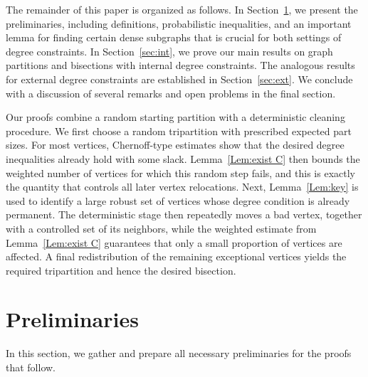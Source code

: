 \documentclass{aic}
\begin{document}
	\bigskip
	
	The remainder of this paper is organized as follows.
	In Section~\ref{sec:pre}, we present the preliminaries, including definitions, probabilistic inequalities,
	and an important lemma for finding certain dense subgraphs that is crucial for both settings of degree constraints.
	In Section~\ref{sec:int}, we prove our main results on graph partitions and bisections with internal degree constraints.
	The analogous results for external degree constraints are established in Section~\ref{sec:ext}.
	We conclude with a discussion of several remarks and open problems in the final section.
	
	\medskip
	
	Our proofs combine a random starting partition with a deterministic cleaning procedure.
	We first choose a random tripartition with prescribed expected part sizes.
	For most vertices, Chernoff-type estimates show that the desired degree inequalities already hold with some slack.
	Lemma~\ref{Lem:exist C} then bounds the weighted number of vertices for which this random step fails, and this is exactly the quantity that controls all later vertex relocations.
	Next, Lemma~\ref{Lem:key} is used to identify a large robust set of vertices whose degree condition is already permanent.
	The deterministic stage then repeatedly moves a bad vertex, together with a controlled set of its neighbors, while the weighted estimate from Lemma~\ref{Lem:exist C} guarantees that only a small proportion of vertices are affected.
	A final redistribution of the remaining exceptional vertices yields the required tripartition and hence the desired bisection.
	
	
	\section{Preliminaries}\label{sec:pre}
	\noindent In this section, we gather and prepare all necessary preliminaries for the proofs that follow.
	
\end{document}
